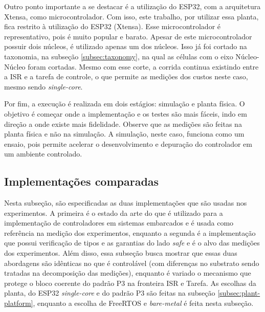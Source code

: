 Outro ponto importante a se destacar é a utilização do ESP32, com a arquitetura Xtensa, como microcontrolador. Com isso, este trabalho, por utilizar essa planta, fica restrito à utilização do ESP32 (Xtensa). Esse microcontrolador é representativo, pois é muito popular e barato. Apesar de este microcontrolador possuir dois núcleos, é utilizado apenas um dos núcleos. Isso já foi cortado na taxonomia, na subseção \ref{subsec:taxonomy}, na qual as células com o eixo Núcleo-Núcleo foram cortadas. Mesmo com esse corte, a corrida continua existindo entre a \ac{ISR} e a tarefa de controle, o que permite as medições dos custos neste caso, mesmo sendo \textit{single-core}.

Por fim, a execução é realizada em dois estágios: simulação e planta física. O objetivo é começar onde a implementação e os testes são mais fáceis, indo em direção a onde existe mais fidelidade. Observe que as medições são feitas na planta física e não na simulação. A simulação, neste caso, funciona como um ensaio, pois permite acelerar o desenvolvimento e depuração do controlador em um ambiente controlado.

\subsection{Implementações comparadas}

Nesta subseção, são especificadas as duas implementações que são usadas nos experimentos. A primeira é o estado da arte do que é utilizado para a implementação de controladores em sistemas embarcados e é usada como referência na medição dos experimentos, enquanto a segunda é a implementação que possui verificação de tipos e as garantias do lado \textit{safe} e é o alvo das medições dos experimentos. Além disso, essa subseção busca mostrar que essas duas abordagens são idênticas no que é controlável (com diferenças no substrato sendo tratadas na decomposição das medições), enquanto é variado o mecanismo que protege o bloco coerente do padrão P3 na fronteira \ac{ISR} e Tarefa. As escolhas da planta, do ESP32 \textit{single-core} e do padrão P3 são feitas na subseção \ref{subsec:plant-platform}, enquanto a escolha de FreeRTOS e \textit{bare-metal} é feita nesta subseção.

